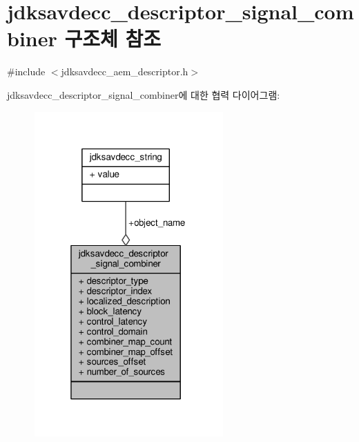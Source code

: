 \hypertarget{structjdksavdecc__descriptor__signal__combiner}{}\section{jdksavdecc\+\_\+descriptor\+\_\+signal\+\_\+combiner 구조체 참조}
\label{structjdksavdecc__descriptor__signal__combiner}


{\ttfamily \#include $<$jdksavdecc\+\_\+aem\+\_\+descriptor.\+h$>$}



jdksavdecc\+\_\+descriptor\+\_\+signal\+\_\+combiner에 대한 협력 다이어그램\+:
\nopagebreak
\begin{figure}[H]
\begin{center}
\leavevmode
\includegraphics[width=205pt]{structjdksavdecc__descriptor__signal__combiner__coll__graph}
\end{center}
\end{figure}
